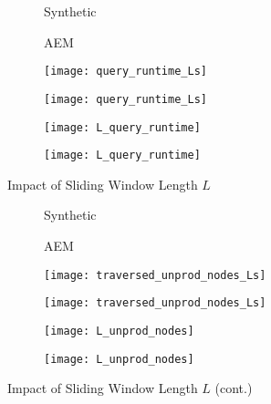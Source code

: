 \documentclass[abstracton,12pt]{scrartcl}
\theoremstyle{definition}
\begin{document}
\begin{figure}[h]
  \centering
  \begin{subfigure}{0.49\linewidth}
    \centering
    Synthetic
  \end{subfigure}
  \begin{subfigure}{0.49\linewidth}
    \centering
    AEM
  \end{subfigure}
  \begin{subfigure}{0.49\linewidth}
    \centering
    \texttt{[image: query\_runtime\_Ls]}
    \caption{}
    \label{fig:query_runtime_Ls_synthetic}
  \end{subfigure}
  \begin{subfigure}{0.49\linewidth}
    \centering
    \texttt{[image: query\_runtime\_Ls]}
    \caption{}
    \label{fig:query_runtime_Ls_aem}
  \end{subfigure}
  \begin{subfigure}{0.49\linewidth}
    \centering
    \texttt{[image: L\_query\_runtime]}
    \caption{}
    \label{fig:L_query_runtime_synthetic}
  \end{subfigure}
  \begin{subfigure}{0.49\linewidth}
    \centering
    \texttt{[image: L\_query\_runtime]}
    \caption{}
    \label{fig:L_query_runtime_aem}
  \end{subfigure}
  \caption{Impact of Sliding Window Length $L$}
\end{figure}

\begin{figure}[h]\ContinuedFloat
  \centering
  \begin{subfigure}{0.49\linewidth}
    \centering
    Synthetic
  \end{subfigure}
  \begin{subfigure}{0.49\linewidth}
    \centering
    AEM
  \end{subfigure}
  \begin{subfigure}{0.49\linewidth}
    \centering
    \texttt{[image: traversed\_unprod\_nodes\_Ls]}
    \caption{}
    \label{fig:trav_unprod_nodes_Ls_synthetic}
  \end{subfigure}
  \begin{subfigure}{0.49\linewidth}
    \centering
    \texttt{[image: traversed\_unprod\_nodes\_Ls]}
    \caption{}
    \label{fig:trav_unprod_nodes_Ls_aem}
  \end{subfigure}
  \begin{subfigure}{0.49\linewidth}
    \centering
    \texttt{[image: L\_unprod\_nodes]}
    \caption{}
    \label{fig:L_unprod_nodes_synthetic}
  \end{subfigure}
  \begin{subfigure}{0.49\linewidth}
    \centering
    \texttt{[image: L\_unprod\_nodes]}
    \caption{}
    \label{fig:L_unprod_nodes_aem}
  \end{subfigure}
  \caption{Impact of Sliding Window Length $L$ (cont.)}
  \label{fig:sliding_window_length}
\end{figure}
\end{document}
